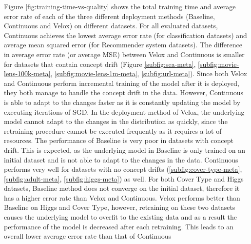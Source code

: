 \documentclass{vldb}
\begin{document}
Figure \ref{fig:training-time-vs-quality} shows the total training time and average error rate of each of the three different deployment methods (Baseline, Continuous and Velox) on different datasets.
For all evaluated datasets, Continuous achieves the lowest average error rate (for classification datasets) and average mean squared error (for Recommender system datasets).
The difference in average error rate (or average MSE) between Velox and Continuous is smaller for datasets that contain concept drift (Figure \ref{subfig:sea-meta}, \ref{subfig:movie-lens-100k-meta}, \ref{subfig:movie-lens-1m-meta}, \ref{subfig:url-meta}).
Since both Velox and Continuous perform incremental training of the model after it is deployed, they both manage to handle the concept drift in the data.
However, Continuous is able to adapt to the changes faster as it is constantly updating the model by executing iterations of SGD.
In the deployment method of Velox, the underlying model cannot adapt to the changes in the distribution as quickly, since the retraining procedure cannot be executed frequently as it requires a lot of resources.
The performance of Baseline is very poor in datasets with concept drift.
This is expected, as the underlying model in Baseline is only trained on an initial dataset and is not able to adapt to the changes in the data.
Continuous performs very well for datasets with no concept drifts (\ref{subfig:cover-type-meta},  \ref{subfig:adult-meta}, \ref{subfig:higgs-meta}) as well.
For both Cover Type and Higgs datasets, Baseline method does not converge on the initial dataset, therefore it has a higher error rate than Velox and Continuous.
Velox performs better than Baseline on Higgs and Cover Type, however, retraining on these two datasets causes the underlying model to overfit to the existing data and as a result the performance of the model is decreased after each retraining.
This leads to an overall lower average error rate than that of Continuous
\end{document}
